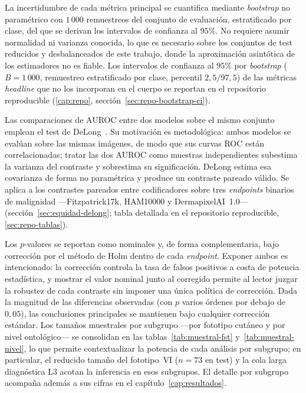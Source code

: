 La incertidumbre de cada métrica principal se cuantifica mediante
\emph{bootstrap} no paramétrico con $1\,000$ remuestreos del
conjunto de evaluación, estratificado por clase, del que se derivan
los intervalos de confianza al $95\%$. No requiere asumir
normalidad ni varianza conocida, lo que es necesario sobre los
conjuntos de test reducidos y desbalanceados de este trabajo, donde
la aproximación asintótica de los estimadores no es fiable. Los
intervalos de confianza al $95\%$ por \emph{bootstrap}
($B = 1\,000$, remuestreo estratificado por clase, percentil
$2{,}5/97{,}5$) de las métricas \emph{headline} que no los
incorporan en el cuerpo se reportan en el repositorio reproducible
(\ref{cap:repo}, sección~\ref{sec:repo-bootstrap-ci}).

Las comparaciones de AUROC entre dos modelos sobre el mismo conjunto
emplean el test de DeLong~\cite{delong1988}. Su motivación es
metodológica: ambos modelos se evalúan sobre las mismas imágenes, de
modo que sus curvas ROC están correlacionadas; tratar las dos AUROC
como muestras independientes subestima la varianza del contraste y
sobrestima su significación. DeLong estima esa covarianza de forma
no paramétrica y produce un contraste pareado válido. Se aplica a los
contrastes pareados entre codificadores sobre tres \emph{endpoints}
binarios de malignidad ---Fitzpatrick17k, HAM10000 y DermapixelAI~1.0---
(sección~\ref{sec:equidad-delong}; tabla detallada en el repositorio reproducible, \ref{sec:repo-tablas}).

Los $p$-valores se reportan como nominales y, de forma
complementaria, bajo corrección por el método de Holm dentro de cada
\emph{endpoint}. Exponer ambos es intencionado: la corrección controla
la tasa de falsos positivos a costa de potencia estadística, y
mostrar el valor nominal junto al corregido permite al lector juzgar
la robustez de cada contraste sin imponer una única política de
corrección. Dada la magnitud de las diferencias observadas (con $p$
varios órdenes por debajo de $0{,}05$), las conclusiones principales
se mantienen bajo cualquier corrección estándar. Los tamaños
muestrales por subgrupo ---por fototipo cutáneo y por nivel
ontológico--- se consolidan en las tablas~\ref{tab:muestral-fst}
y~\ref{tab:muestral-nivel}, lo que permite contextualizar la potencia
de cada análisis por subgrupo; en particular, el reducido tamaño del
fototipo~VI ($n = 73$ en test) y la cola larga diagnóstica L3 acotan la
inferencia en esos subgrupos. El detalle por subgrupo acompaña además
a sus cifras en el capítulo~\ref{cap:resultados}.

